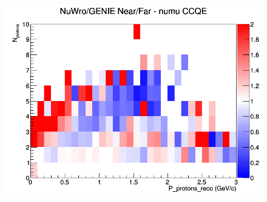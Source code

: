 \documentclass[12pt]{article}
\begin{document}
\begin{figure}[h]
\endminipage
{}
\includegraphics[width=\linewidth]{eff_N_P/FGT/protons/ratios/CCQE_NuWro_GENIE_numu_NF_N_P.png}
\endminipage
\newline
\end{figure}
\clearpage
\end{document}

